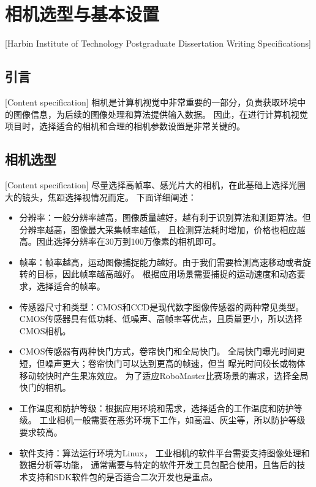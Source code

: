 

\chapter[相机选型与基本设置]{相机选型与基本设置}[Harbin Institute of Technology Postgraduate Dissertation Writing Specifications]

\section{引言}[Content specification]
相机是计算机视觉中非常重要的一部分，负责获取环境中的图像信息，为后续的图像处理和算法提供输入数据。
因此，在进行计算机视觉项目时，选择适合的相机和合理的相机参数设置是非常关键的。

\section{相机选型}[Content specification]
尽量选择高帧率、感光片大的相机，在此基础上选择光圈大的镜头，焦距选择视情况而定。
下面详细阐述：\par

\begin{itemize}[itemindent=2em]
    \item 分辨率：一般分辨率越高，图像质量越好，越有利于识别算法和测距算法。但分辨率越高，图像最大采集帧率越低，
    且检测算法耗时增加，价格也相应越高。因此选择分辨率在30万到100万像素的相机即可。
    \item 帧率：帧率越高，运动图像捕捉能力越好。由于我们需要检测高速移动或者旋转的目标，因此帧率越高越好。
    根据应用场景需要捕捉的运动速度和动态要求，选择适合的帧率。
    \item 传感器尺寸和类型：CMOS和CCD是现代数字图像传感器的两种常见类型。
    CMOS传感器具有低功耗、低噪声、高帧率等优点，且质量更小，所以选择CMOS相机。
    \item CMOS传感器有两种快门方式，卷帘快门和全局快门。
    全局快门曝光时间更短，但噪声更大；卷帘快门可以达到更高的帧速，但当
    曝光时间较长或物体移动较快时产生果冻效应。
    为了适应RoboMaster比赛场景的需求，选择全局快门的相机。
    \item 工作温度和防护等级：根据应用环境和需求，选择适合的工作温度和防护等级。
    工业相机一般需要在恶劣环境下工作，如高温、灰尘等，所以防护等级要求较高。
    \item 软件支持：算法运行环境为Linux，
    工业相机的软件平台需要支持图像处理和数据分析等功能，
    通常需要与特定的软件开发工具包配合使用，且售后的技术支持和SDK软件包的是否适合二次开发也是重点。

\end{itemize}


